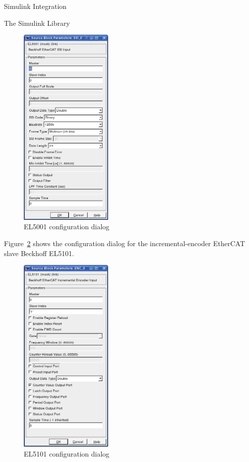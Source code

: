 \begin{ighsec}{Simulink Integration}
\begin{ighsec}{The Simulink Library}
\begin{figure}[H]
  \begin{center}
    \includegraphics[width=0.4\textwidth]{images/el5001.png}
    \caption{EL5001 configuration dialog}
    \label{fig:el5001}
  \end{center}
\end{figure}

Figure~\ref{fig:el5101} shows the configuration dialog for the
incremental-encoder EtherCAT slave Beckhoff EL5101.

\begin{figure}[H]
  \begin{center}
    \includegraphics[width=0.4\textwidth]{images/el5101.png}
    \caption{EL5101 configuration dialog}
    \label{fig:el5101}
  \end{center}
\end{figure}


\end{ighsec}
\end{ighsec}
